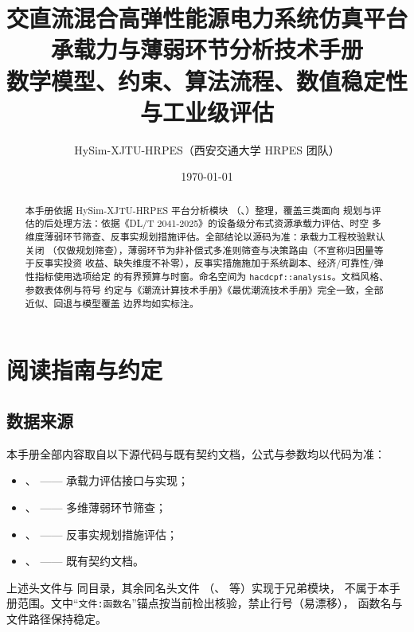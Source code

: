 \documentclass[UTF8,fontset=fandol,a4paper,11pt]{ctexart}
\title{\textbf{交直流混合高弹性能源电力系统仿真平台}\\[0.5em]
       {\Large 承载力与薄弱环节分析技术手册}\\[0.3em]
       {\large 数学模型、约束、算法流程、数值稳定性与工业级评估}}
\author{HySim-XJTU-HRPES（西安交通大学 HRPES 团队）}
\date{\today}
\begin{document}
\maketitle
\begin{abstract}
\noindent 本手册依据 HySim-XJTU-HRPES 平台分析模块
（、）整理，覆盖三类面向
规划与评估的后处理方法：依据《DL/T 2041-2025》的设备级分布式资源承载力评估、时空
多维度薄弱环节筛查、反事实规划措施评估。全部结论以源码为准：承载力工程校验默认关闭
（仅做规划筛查），薄弱环节为非补偿式多准则筛查与决策路由（不宣称归因量等于反事实投资
收益、缺失维度不补零），反事实措施施加于系统副本、经济/可靠性/弹性指标使用选项给定
的有界预算与时窗。命名空间为 \texttt{hacdcpf::analysis}。文档风格、参数表体例与符号
约定与《潮流计算技术手册》《最优潮流技术手册》完全一致，全部近似、回退与模型覆盖
边界均如实标注。
\end{abstract}

\tableofcontents
\newpage

\section{阅读指南与约定}
\subsection{数据来源}
本手册全部内容取自以下源代码与既有契约文档，公式与参数均以代码为准：
\begin{itemize}
  \item {}、
         —— 承载力评估接口与实现；
  \item {}、
         —— 多维薄弱环节筛查；
  \item {}、
         —— 反事实规划措施评估；
  \item {}、
         —— 既有契约文档。
\end{itemize}
上述头文件与  同目录，其余同名头文件
（、 等）实现于兄弟模块，
不属于本手册范围。文中“\texttt{文件:函数名}”锚点按当前检出核验，禁止行号（易漂移），
函数名与文件路径保持稳定。
\end{document}
